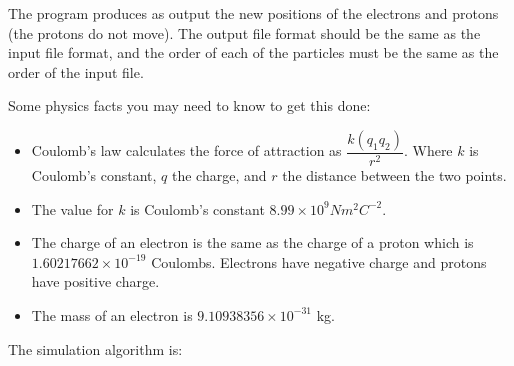 \documentclass[letterpaper,10pt]{article}
\begin{document}
The program produces as output the new positions of the electrons and protons (the protons do not move). The output file format should be the same as the input file format, and the order of each of the particles must be the same as the order of the input file.

Some physics facts you may need to know to get this done:

\begin{itemize}
\item Coulomb's law calculates the force of attraction as $\dfrac{k (q_{1} q_{2})}{r^{2}}$.  Where $k$ is Coulomb's constant, $q$ the charge, and $r$ the distance between the two points.

\item The value for $k$ is Coulomb's constant $8.99 \times 10^{9} N m^{2} C^{-2}$. 

\item The charge of an electron is the same as the charge of a proton which is $1.60217662 \times 10^{-19}$ Coulombs. Electrons have negative charge and protons have positive charge. 

\item The mass of an electron is $9.10938356 \times 10^{-31}$ kg.
\end{itemize}


The simulation algorithm is:
\end{document}
